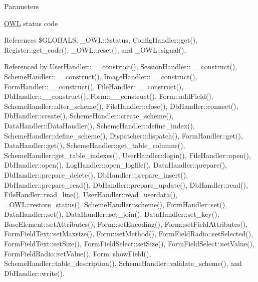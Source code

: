 \begin{DoxyParams}{Parameters}
\item[\mbox{\tt[in]} {\em \$status}]\hyperlink{classOWL}{OWL} status code \item[\mbox{\tt[in]} {\em \$params}]\end{DoxyParams}


References \$GLOBALS, \_\-OWL::\$status, ConfigHandler::get(), Register::get\_\-code(), \_\-OWL::reset(), and \_\-OWL::signal().



Referenced by UserHandler::\_\-\_\-construct(), SessionHandler::\_\-\_\-construct(), SchemeHandler::\_\-\_\-construct(), ImageHandler::\_\-\_\-construct(), FormHandler::\_\-\_\-construct(), FileHandler::\_\-\_\-construct(), DbHandler::\_\-\_\-construct(), Form::\_\-\_\-construct(), Form::addField(), SchemeHandler::alter\_\-scheme(), FileHandler::close(), DbHandler::connect(), DbHandler::create(), SchemeHandler::create\_\-scheme(), DataHandler::DataHandler(), SchemeHandler::define\_\-index(), SchemeHandler::define\_\-scheme(), Dispatcher::dispatch(), FormHandler::get(), DataHandler::get(), SchemeHandler::get\_\-table\_\-columns(), SchemeHandler::get\_\-table\_\-indexes(), UserHandler::login(), FileHandler::open(), DbHandler::open(), LogHandler::open\_\-logfile(), DataHandler::prepare(), DbHandler::prepare\_\-delete(), DbHandler::prepare\_\-insert(), DbHandler::prepare\_\-read(), DbHandler::prepare\_\-update(), DbHandler::read(), FileHandler::read\_\-line(), UserHandler::read\_\-userdata(), \_\-OWL::restore\_\-status(), SchemeHandler::scheme(), FormHandler::set(), DataHandler::set(), DataHandler::set\_\-join(), DataHandler::set\_\-key(), BaseElement::setAttributes(), Form::setEncoding(), Form::setFieldAttributes(), FormFieldText::setMaxsize(), Form::setMethod(), FormFieldRadio::setSelected(), FormFieldText::setSize(), FormFieldSelect::setSize(), FormFieldSelect::setValue(), FormFieldRadio::setValue(), Form::showField(), SchemeHandler::table\_\-description(), SchemeHandler::validate\_\-scheme(), and DbHandler::write().

